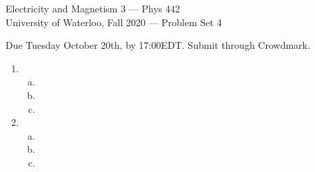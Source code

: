 \documentclass[12pt,geometry,width=8in]{article}
\begin{document}
\chead{}
\renewcommand{\headrulewidth}{0pt}

\begin{center}
  {\large
    Electricity and Magnetism 3 --- Phys 442  \\
    University of Waterloo, Fall 2020
    --- Problem Set 4
    \par
  }
\end{center}

\vspace{0.1in}

Due Tuesday October 20th, by 17:00EDT.  Submit through Crowdmark.

\vspace{0.1in}

\noindent

\begin{enumerate}[(1),topsep=0pt,itemsep=0ex,partopsep=1ex,parsep=1ex]
\item
\begin{enumerate}[(a)]
\item

\newpage

\item

\newpage

\item

\end{enumerate}

\newpage

\item
\begin{enumerate}[(a)]

\item

\newpage

\item

\newpage

\item

\end{enumerate}

\end{enumerate}
\end{document}
